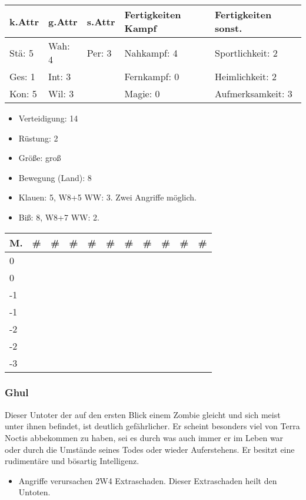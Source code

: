 \documentclass{article}
\begin{document}
\begin{small}
\begin{tabular}{|m{15mm}|m{15mm}|m{15mm}|m{35mm}|m{35mm}|}
\hline
\textbf{k.Attr}&\textbf{g.Attr}&\textbf{s.Attr}&\textbf{Fertigkeiten Kampf}&\textbf{Fertigkeiten sonst.}\\
\hline
\hline
Stä: 5&Wah: 4&Per: 3&Nahkampf: 4&Sportlichkeit: 2\\
\hline
Ges: 1&Int: 3& &Fernkampf: 0&Heimlichkeit: 2\\
\hline
Kon: 5&Wil: 3& &Magie: 0&Aufmerksamkeit: 3\\
\hline
\end{tabular}
\end{small}


\begin{itemize}
\item Verteidigung: 14
\item Rüstung:      2
\item Größe: groß
\item Bewegung (Land): 8
\item Klauen: 5, W8+5 WW: 3. Zwei Angriffe möglich.
\item Biß: 8, W8+7 WW: 2.
\end{itemize}


\begin{small}
\begin{tabular}{|m{6mm}|m{3mm}|m{3mm}|m{3mm}|m{3mm}|m{3mm}|m{3mm}|m{3mm}|m{3mm}|m{3mm}|m{3mm}|}
\hline
\textbf{M.}&\textbf{\#}&\textbf{\#}&\textbf{\#}&\textbf{\#}&\textbf{\#}&\textbf{\#}&\textbf{\#}&\textbf{\#}&\textbf{\#}&\textbf{\#}\\
\hline
\hline
0& & & & & & & & & & \\
\hline
0& & & & & & & & & & \\
\hline
-1& & & & & & & & & & \\
\hline
-1& & & & & & & & & & \\
\hline
-2& & & & & & & & & & \\
\hline
-2& & & & & & & & & & \\
\hline
-3& & & & & & & & & & \\
\hline
\end{tabular}
\end{small}

\subsubsection{Ghul}

Dieser Untoter der auf den ersten Blick einem Zombie gleicht und sich meist unter ihnen befindet, ist deutlich
gefährlicher. Er scheint besonders viel von Terra Noctis abbekommen zu haben, sei es durch was auch immer er im
Leben war oder durch die Umstände seines Todes oder wieder Auferstehens. Er besitzt eine rudimentäre und bösartig
Intelligenz.
\begin{itemize}
\item Angriffe verursachen 2W4 Extraschaden. Dieser Extraschaden heilt den Untoten.
\end{itemize}
\end{document}
